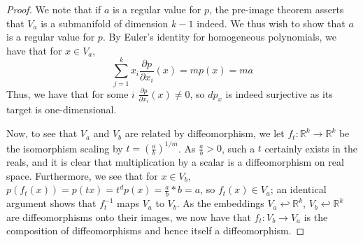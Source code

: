 \documentclass[english]{article}
\newcommand{\pydx}[2]{\frac{\partial #1}{\partial #2}}
\newcommand{\RR}{\mathbb{R}}
\theoremstyle{remark}
\theoremstyle{definition}
\begin{document}
\begin{proof}
	We note that if $a$ is a regular value for $p$, the pre-image theorem asserts that $V_a$ is a submanifold of dimension $k-1$ indeed. We thus wish to show that $a$ is a regular value for $p$. By Euler's identity for homogeneous polynomials, we have that for $x\in V_a$,
	$$\sum_{j=1}^kx_i\pydx{p}{x_i}(x)=mp(x)=ma$$
	Thus, we have that for some $i$ $\pydx{p}{x_i}(x)\neq 0$, so $dp_x$ is indeed surjective as its target is one-dimensional.
	
	Now, to see that $V_a$ and $V_b$ are related by diffeomorphism, we let $f_t:\RR^k\to \RR^k$ be the isomorphism scaling by $t=\left(\frac{a}{b}\right)^{1/m}$. As $\frac{a}{b}>0$, such a $t$ certainly exists in the reals, and it is clear that multiplication by a scalar is a diffeomorphism on real space. Furthermore, we see that for $x\in V_b$, $p(f_t(x))=p(tx)=t^dp(x)=\frac{a}{b}*b=a$, so $f_t(x)\in V_a$; an identical argument shows that $f_t^{-1}$ maps $V_a$ to $V_b$. As the embeddings $V_a\hookleftarrow \RR^k$, $V_b\hookleftarrow \RR^k$ are diffeomorphisms onto their images, we now have that $f_t:V_b\to V_a$ is the composition of diffeomorphisms and hence itself a diffeomorphism.  
	
\end{proof}
\end{document}
